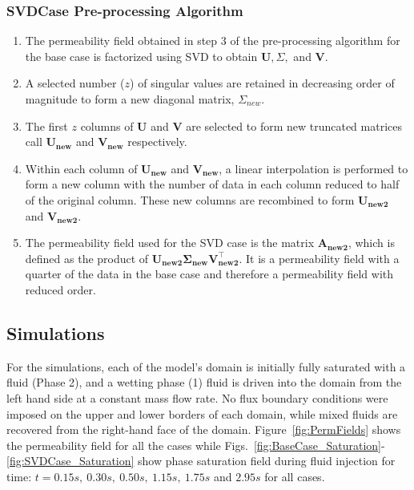 \documentclass[preprint,12pt]{elsarticle}
\begin{document}
\subsubsection{SVDCase Pre-processing Algorithm}\label{subsubsection:svdcase_preprocess_algorithm}
\begin{enumerate}[1.]
  \item The permeability field obtained in step 3 of the pre-processing algorithm for the base case is factorized using SVD to obtain $\mathbf{U}, \Sigma,$ and $\mathbf{V}$.
  \item A selected number ($z$) of singular values are retained in decreasing order of magnitude to form a new diagonal matrix, $\Sigma_{new}$.
  \item The first $z$ columns of $\mathbf{U}$ and $\mathbf{V}$ are selected to form new truncated matrices call $\mathbf{U_{new}}$ and $\mathbf{V_{new}}$ respectively.
  \item Within each column of $\mathbf{U_{new}}$ and $\mathbf{V_{new}}$, a linear interpolation is performed to form a new column with the number of data in each column reduced to half of the original column. These new columns are recombined to form $\mathbf{U_{new2}}$ and $\mathbf{V_{new2}}$.
  \item The permeability field used for the SVD case is the matrix $\mathbf{A_{new2}}$, which is defined as the product of $\mathbf{U_{new2}} \mathbf{\Sigma_{new}} \mathbf{V_{new2}^{\intercal}}$. It is a permeability field with a quarter of the data in the base case and therefore a permeability field with reduced order.  
\end{enumerate}

\subsection{Simulations}\label{subsection:simulations}
For the simulations, each of the model's domain is initially fully saturated with a fluid (Phase 2), and a wetting phase (1) fluid is driven into the domain from the left hand side at a constant mass flow rate. No flux boundary conditions were imposed on the upper and lower borders of each domain, while mixed fluids are recovered from the right-hand face of the domain. Figure~\ref{fig:PermFields} shows the permeability field for all the cases while Figs.~\ref{fig:BaseCase_Saturation}-\ref{fig:SVDCase_Saturation} show phase saturation field during fluid injection for time: $t = 0.15s,~0.30s,~0.50s,~1.15s,~1.75s$ and $2.95s$ for all cases. 
\end{document}
